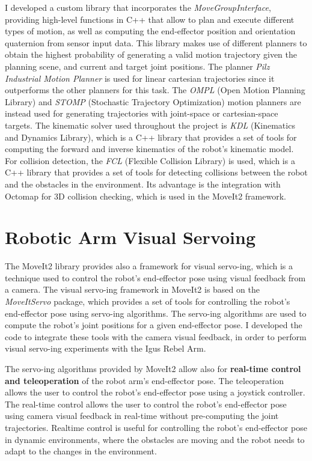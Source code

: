 I developed a custom library that incorporates the \textit{MoveGroupInterface}, providing high-level functions
in C++ that allow to plan and execute different types of motion, as well as computing the end-effector position
and orientation quaternion from sensor input data. This library makes use of different planners to obtain
the highest probability of generating a valid motion trajectory given the planning scene, and current and target
joint positions. The planner \textit{Pilz Industrial Motion Planner} is used for linear cartesian trajectories 
since it outperforms the other planners for this task. The \textit{OMPL} (Open Motion Planning Library) and
\textit{STOMP} (Stochastic Trajectory Optimization) motion planners
are instead used for generating trajectories with joint-space or cartesian-space targets.
The kinematic solver used throughout the project is \textit{KDL} (Kinematics and Dynamics Library), which is a C++ library
that provides a set of tools for computing the forward and inverse kinematics of the robot's kinematic model.
For collision detection, the \textit{FCL} (Flexible Collision Library) is used, which is a C++ library that provides
a set of tools for detecting collisions between the robot and the obstacles in the environment.
Its advantage is the integration with Octomap for 3D collision checking, which is used in the MoveIt2 framework.

\section{Robotic Arm Visual Servoing}

The MoveIt2 library provides also a framework for visual servo-ing, which is a technique used to control the robot's
end-effector pose using visual feedback from a camera. The visual servo-ing framework in MoveIt2 is based on the
\textit{MoveItServo} package, which provides a set of tools for controlling the robot's end-effector pose using
servo-ing algorithms. The servo-ing algorithms are used to compute the robot's joint positions for a given end-effector
pose. I developed the code to integrate these tools with the camera visual feedback, in order to perform visual servo-ing
experiments with the Igus Rebel Arm. 

The servo-ing algorithms provided by MoveIt2 allow also for \textbf{real-time control and teleoperation} of the robot arm's
end-effector pose. The teleoperation allows the user to control the robot's end-effector pose using a joystick controller.
The real-time control allows the user to control the robot's end-effector pose using camera visual feedback
in real-time without pre-computing the joint trajectories. Realtime control is useful for controlling the robot's
end-effector pose in dynamic environments, where the obstacles are moving and the robot needs to adapt to the changes
in the environment.

